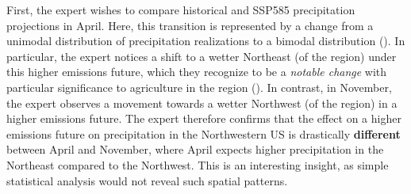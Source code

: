%
%


First, the expert wishes to compare historical and SSP585 precipitation projections in April. 
%
Here, this transition is represented by a change from a unimodal distribution of precipitation realizations to a bimodal distribution ().
%
In particular, the expert notices a shift to a wetter Northeast (of the region) under this higher emissions future, which they recognize to be a \textit{notable change} with particular significance to agriculture in the region ().
%
In contrast, in November, the expert observes a movement towards a wetter Northwest (of the region) in a higher emissions future.
%
The expert therefore confirms that the effect on a higher emissions future on precipitation in the Northwestern US is drastically \textbf{different} between April and November, where April expects higher precipitation in the Northeast compared to the Northwest.
%
This is an interesting insight, as simple statistical analysis would not reveal such spatial patterns.


%



